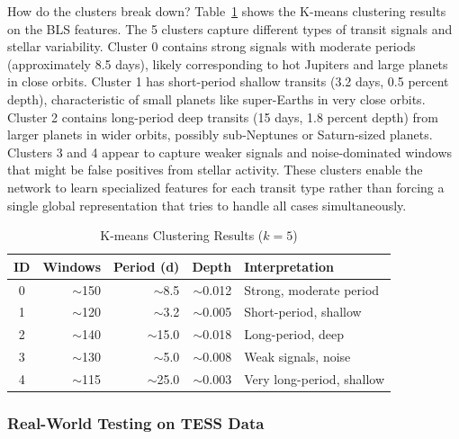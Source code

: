 \documentclass[letterpaper]{article} %
\begin{document}
How do the clusters break down? Table~\ref{tab:bilstm_clusters} shows the K-means clustering results on the BLS features. The 5 clusters capture different types of transit signals and stellar variability. Cluster 0 contains strong signals with moderate periods (approximately 8.5 days), likely corresponding to hot Jupiters and large planets in close orbits. Cluster 1 has short-period shallow transits (3.2 days, 0.5 percent depth), characteristic of small planets like super-Earths in very close orbits. Cluster 2 contains long-period deep transits (15 days, 1.8 percent depth) from larger planets in wider orbits, possibly sub-Neptunes or Saturn-sized planets. Clusters 3 and 4 appear to capture weaker signals and noise-dominated windows that might be false positives from stellar activity. These clusters enable the network to learn specialized features for each transit type rather than forcing a single global representation that tries to handle all cases simultaneously.

\begin{table}[h]
\centering
\caption{K-means Clustering Results ($k=5$)}
\label{tab:bilstm_clusters}
\begin{tabular}{@{}crrrp{2.5cm}@{}}
\toprule
\textbf{ID} & \textbf{Windows} & \textbf{Period (d)} & \textbf{Depth} & \textbf{Interpretation} \\
\midrule
0 & $\sim$150 & $\sim$8.5 & $\sim$0.012 & Strong, moderate period \\
1 & $\sim$120 & $\sim$3.2 & $\sim$0.005 & Short-period, shallow \\
2 & $\sim$140 & $\sim$15.0 & $\sim$0.018 & Long-period, deep \\
3 & $\sim$130 & $\sim$5.0 & $\sim$0.008 & Weak signals, noise \\
4 & $\sim$115 & $\sim$25.0 & $\sim$0.003 & Very long-period, shallow \\
\bottomrule
\end{tabular}
\end{table}

\subsubsection{Real-World Testing on TESS Data}
\end{document}
